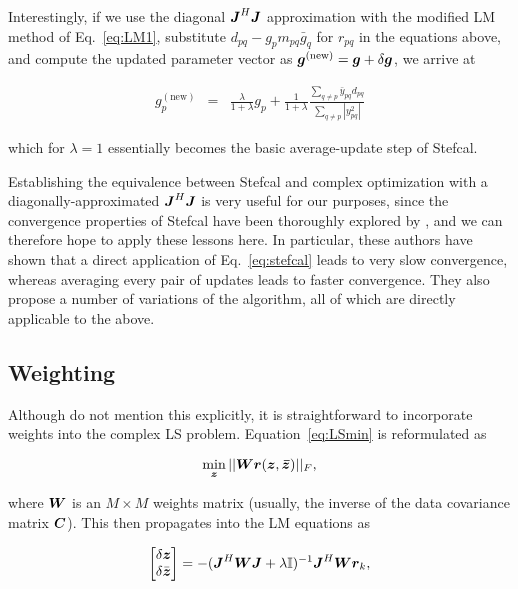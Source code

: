 \documentclass[useAMS,usenatbib]{mn2e}
\newcommand{\II}{\mathbb{I}}
\newcommand{\zz}{\bmath{z}}
\newcommand{\mat}[1]{{\bmath{#1}}}
\newcommand{\JJ}{\mat{J}} %
\begin{document}
Interestingly, if we use the diagonal $\JJ^H\JJ$ approximation with the modified LM method of Eq.~\ref{eq:LM1}, substitute 
$d_{pq} - g_p m_{pq} \bar{g}_q $ for $r_{pq}$ in the equations above, and compute the updated parameter vector as 
$\bmath{g}^\mathrm{(new)} = \bmath{g}+\delta \bmath{g}$, we arrive at


\begin{eqnarray*}
g_p^\mathrm{(new)} &=& \frac{\lambda}{1+\lambda}g_p + \frac{1}{1+\lambda} \frac{\sum\limits_{q\ne p} \bar{y}_{pq} d_{pq}}{\sum\limits_{q\ne p} |y^2_{pq}|}
\end{eqnarray*}

which for $\lambda=1$ essentially becomes the basic average-update step of Stefcal.

Establishing the equivalence between Stefcal and complex optimization with a diagonally-approximated $\JJ^H\JJ$ is 
very useful for our purposes, since the convergence properties of Stefcal have been thoroughly explored 
by \citet{Stefcal}, and we can therefore hope to apply these lessons here. In particular, these authors have shown 
that a direct application of Eq.~\ref{eq:stefcal} leads to very slow convergence, whereas averaging every pair of 
updates leads to faster convergence. They also propose a number of variations of the algorithm, all of which are 
directly applicable to the above.

\subsection{Weighting}
\label{sec:DI:W}

Although \citet{ComplexOpt} do not mention this explicitly, it is straightforward to incorporate weights into the 
complex LS problem. Equation~\ref{eq:LSmin} is reformulated as

\begin{equation}
\label{eq:LSmin:w}
\min_{\bmath{z}} ||\mat{W} \bmath{r}(\bmath{z},\bmath{\bar z})||_F,
\end{equation}

where $\mat{W}$ is an $M\times M$ weights matrix (usually, the inverse of the data covariance matrix $\mat{C}$). This then propagates into the 
LM equations as

\begin{equation}
\label{eq:LM:W}
\Matrix{c}{\delta \zz \\ \delta \bar{\zz}} = -(\JJ^H \mat{W} \JJ + \lambda\II)^{-1}\JJ^H \mat{W} \bmath{r}_k,
\end{equation}
\end{document}

